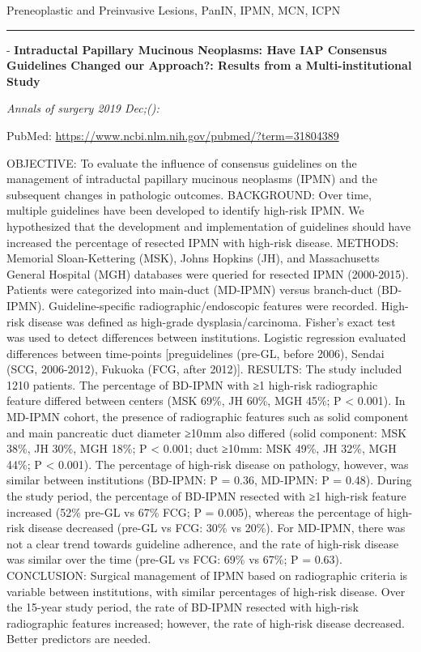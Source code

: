 \documentclass[
]{article}
\renewcommand{\linethickness}{0.05em}
\begin{document}
Preneoplastic and Preinvasive Lesions, PanIN, IPMN, MCN, ICPN

\begin{center}\rule{0.5\linewidth}{\linethickness}\end{center}

- \textbf{Intraductal Papillary Mucinous Neoplasms: Have IAP Consensus
Guidelines Changed our Approach?: Results from a Multi-institutional
Study}

\emph{Annals of surgery 2019 Dec;():}

PubMed: \url{https://www.ncbi.nlm.nih.gov/pubmed/?term=31804389}

OBJECTIVE: To evaluate the influence of consensus guidelines on the
management of intraductal papillary mucinous neoplasms (IPMN) and the
subsequent changes in pathologic outcomes. BACKGROUND: Over time,
multiple guidelines have been developed to identify high-risk IPMN. We
hypothesized that the development and implementation of guidelines
should have increased the percentage of resected IPMN with high-risk
disease. METHODS: Memorial Sloan-Kettering (MSK), Johns Hopkins (JH),
and Massachusetts General Hospital (MGH) databases were queried for
resected IPMN (2000-2015). Patients were categorized into main-duct
(MD-IPMN) versus branch-duct (BD-IPMN). Guideline-specific
radiographic/endoscopic features were recorded. High-risk disease was
defined as high-grade dysplasia/carcinoma. Fisher's exact test was used
to detect differences between institutions. Logistic regression
evaluated differences between time-points {[}preguidelines (pre-GL,
before 2006), Sendai (SCG, 2006-2012), Fukuoka (FCG, after 2012){]}.
RESULTS: The study included 1210 patients. The percentage of BD-IPMN
with ≥1 high-risk radiographic feature differed between centers (MSK
69\%, JH 60\%, MGH 45\%; P \textless{} 0.001). In MD-IPMN cohort, the
presence of radiographic features such as solid component and main
pancreatic duct diameter ≥10 mm also differed (solid component: MSK
38\%, JH 30\%, MGH 18\%; P \textless{} 0.001; duct ≥10 mm: MSK 49\%, JH
32\%, MGH 44\%; P \textless{} 0.001). The percentage of high-risk
disease on pathology, however, was similar between institutions
(BD-IPMN: P = 0.36, MD-IPMN: P = 0.48). During the study period, the
percentage of BD-IPMN resected with ≥1 high-risk feature increased (52\%
pre-GL vs 67\% FCG; P = 0.005), whereas the percentage of high-risk
disease decreased (pre-GL vs FCG: 30\% vs 20\%). For MD-IPMN, there was
not a clear trend towards guideline adherence, and the rate of high-risk
disease was similar over the time (pre-GL vs FCG: 69\% vs 67\%; P =
0.63). CONCLUSION: Surgical management of IPMN based on radiographic
criteria is variable between institutions, with similar percentages of
high-risk disease. Over the 15-year study period, the rate of BD-IPMN
resected with high-risk radiographic features increased; however, the
rate of high-risk disease decreased. Better predictors are needed.
\end{document}
